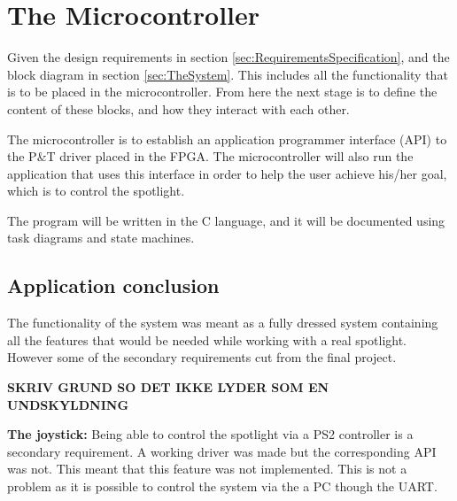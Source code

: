 \section{The Microcontroller}
\label{sec:TheMicrocontroller}

 Given the design requirements in section \ref{sec:RequirementsSpecification}, and the block diagram in section \ref{sec:TheSystem}. This includes all the functionality that is to be placed in the microcontroller. From here the next stage is to define the content of these blocks, and how they interact with each other. 
 
 The microcontroller is to establish an application programmer interface (API) to the P\&T driver placed in the FPGA. The microcontroller will also run the application that uses this interface in order to help the user achieve his/her goal, which is to control the spotlight.
 
 The program will be written in the C language, and it will be documented using task diagrams and state machines. 
















\subsection{Application conclusion}

The functionality of the system was meant as a fully dressed system containing all the features that would be needed while working with a real spotlight. However some of the secondary requirements cut from the final project.

\textbf{SKRIV GRUND SO DET IKKE LYDER SOM EN UNDSKYLDNING}


\textbf{The joystick:} Being able to control the spotlight via a PS2 controller is a secondary requirement. A working driver was made but the corresponding API was not. This meant that this feature was not implemented. This is not a problem as it is possible to control the system via the a PC though the UART.


